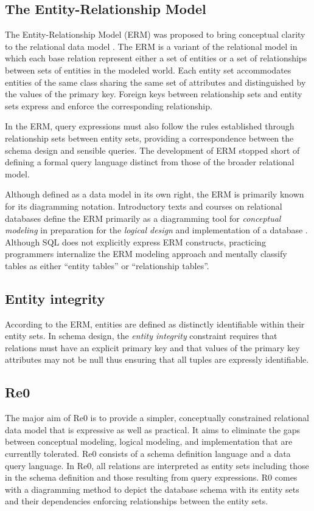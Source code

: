 \documentclass[letter,twocolumn,11pt]{article}
\begin{document}
\subsection{The Entity-Relationship Model}
The Entity-Relationship Model (ERM) was proposed to bring conceptual clarity to the relational data model \citep{chen_entity_1976}.  
The ERM is a variant of the relational model in which each base relation represent either a set of entities or a set of relationships between sets of entities in the modeled world. 
Each entity set accommodates entities of the same class sharing the same set of attributes and distinguished by the values of the primary key.
Foreign keys between relationship sets and entity sets express and enforce the corresponding relationship.

In the ERM, query expressions must also follow the rules established through relationship sets between entity sets, providing a correspondence between the schema design and sensible queries. 
The development of ERM stopped short of defining a formal query language distinct from those of the broader relational model.

Although defined as a data model in its own right, the ERM is primarily known for its diagramming notation. 
Introductory texts and courses on relational databases define the ERM primarily as a diagramming tool for \emph{conceptual modeling} in preparation for the \emph{logical design} and implementation of a database \citep{elmasri-2015-fundamentals, coronel-2016-database}.
Although SQL does not explicitly express ERM constructs, practicing programmers internalize the ERM modeling approach and mentally classify tables as either ``entity tables'' or ``relationship tables''.

\subsection{Entity integrity}
According to the ERM, entities are defined as distinctly identifiable within their entity sets. 
In schema design, the \emph{entity integrity} constraint requires that relations must have an explicit primary key and that values of the primary key attributes may not be null thus ensuring that all tuples are expressly identifiable.

\subsection{Re0}
The major aim of Re0 is to provide a simpler, conceptually constrained relational data model that is expressive as well as practical. It aims to eliminate the gaps between conceptual modeling, logical modeling, and implementation that are currentlly tolerated. 
Re0 consists of a schema definition language and a data query language. 
In Re0, all relations are interpreted as entity sets including those in the schema definition and those resulting from query expressions. 
R0 comes with a diagramming method to depict the database schema with its entity sets and their dependencies enforcing relationships between the entity sets.
\end{document}

